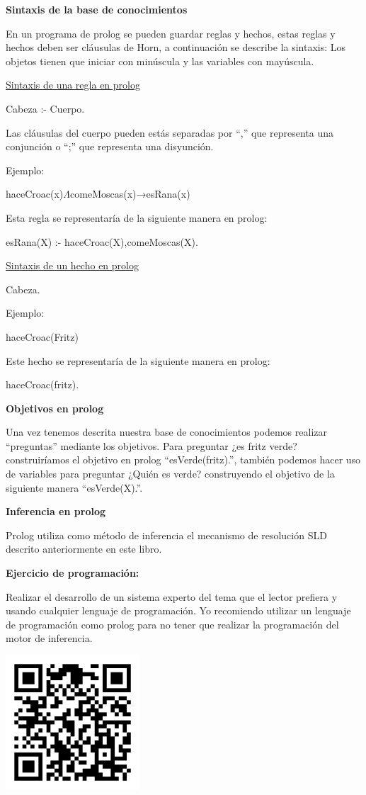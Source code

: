 \documentclass[11pt,fleqn]{book} %
\begin{document}
\textbf{Sintaxis de la base de conocimientos}

En un programa de prolog se pueden guardar reglas y hechos, estas reglas y hechos deben ser cláusulas de Horn, a continuación se describe la sintaxis:
Los objetos tienen que iniciar con minúscula y las variables con mayúscula.

\underline{Sintaxis de una regla en prolog}

Cabeza :- Cuerpo.

Las cláusulas del cuerpo pueden estás separadas por “,” que representa una conjunción o “;” que representa una disyunción.

Ejemplo:

haceCroac(x)$\Lambda$comeMoscas(x)→esRana(x)

Esta regla se representaría de la siguiente manera en prolog:

esRana(X) :- haceCroac(X),comeMoscas(X).

\underline{Sintaxis de un hecho en prolog}

Cabeza.

Ejemplo:

haceCroac(Fritz)

Este hecho se representaría de la siguiente manera en prolog:

haceCroac(fritz).

\textbf{Objetivos en prolog}

Una vez tenemos descrita nuestra base de conocimientos podemos realizar “preguntas” mediante los objetivos. Para preguntar ¿es fritz verde? construiríamos el objetivo en prolog “esVerde(fritz).”, también podemos hacer uso de variables para preguntar ¿Quién es verde? construyendo el objetivo de la siguiente manera “esVerde(X).”.

\textbf{Inferencia en prolog}

Prolog utiliza como método de inferencia el mecanismo de resolución SLD descrito anteriormente en este libro.

\clearpage

\textbf{Ejercicio de programación:}

Realizar el desarrollo de un sistema experto del tema que el lector prefiera y usando cualquier lenguaje de programación. Yo recomiendo utilizar un lenguaje de programación como prolog para no tener que realizar la programación del motor de inferencia.

\includegraphics[width=5cm]{Pictures/github/sisema-experto.png}
\end{document}
